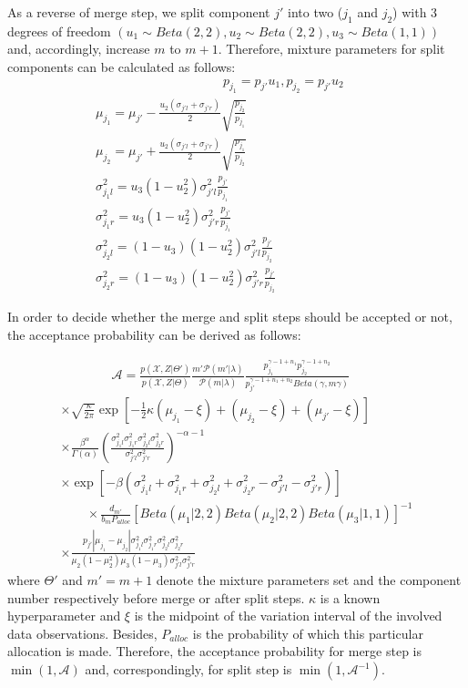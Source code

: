 As a reverse of merge step, we split component $j'$ into two ($j_1$ and $j_2$) with 3 degrees of freedom $(u_1 \sim Beta(2,2), u_2 \sim Beta(2,2), u_3 \sim Beta(1,1))$ and, accordingly, increase $m$ to $m+1$. Therefore, mixture parameters for split components can be calculated as follows:
\begin{multline}
\qquad\qquad\qquad\qquad\qquad p_{j_1} = p_{j'}u_1, p_{j_2} = p_{j'}u_2 \\
\mu_{j_1} = \mu_{j'} - \frac{u_2(\sigma_{j'l}+\sigma_{j'r})}{2} \sqrt{\frac{p_{j_2}}{p_{j_1}}} \\
\mu_{j_2} = \mu_{j'} + \frac{u_2(\sigma_{j'l}+\sigma_{j'r})}{2} \sqrt{\frac{p_{j_1}}{p_{j_2}}} \\
\sigma_{j_1l}^2 = u_3(1-u_2^2)\sigma_{j'l}^2\frac{p_{j'}}{p_{j_1}} \\
\sigma_{j_1r}^2 = u_3(1-u_2^2)\sigma_{j'r}^2\frac{p_{j'}}{p_{j_1}} \\
\sigma_{j_2l}^2 = (1-u_3)(1-u_2^2)\sigma_{j'l}^2\frac{p_{j'}}{p_{j_2}} \\
\sigma_{j_2r}^2 = (1-u_3)(1-u_2^2)\sigma_{j'r}^2\frac{p_{j'}}{p_{j_2}} \qquad\qquad\qquad\qquad
\label{eq:split}
\end{multline}

In order to decide whether the merge and split steps should be accepted or not, the acceptance probability \cite{Richardson1997} can be derived as follows: 

\begin{multline}
\qquad\qquad \mathcal{A}=\frac{p(\mathcal{X},Z|\Theta')}{p(\mathcal{X},Z|\Theta)}\frac{m'\mathcal{P}(m'|\lambda)}{\mathcal{P}(m|\lambda)}\frac{p_{j_1}^{\gamma-1+n_1}p_{j_2}^{\gamma-1+n_2}}{p_{j'}^{\gamma-1+n_1+n_2}Beta(\gamma,m\gamma)} \\
\times \sqrt{\frac{\kappa}{2\pi}} \exp[-\frac{1}{2}\kappa{(\mu_{j_1}-\xi)+(\mu_{j_2}-\xi)+(\mu_{j'}-\xi)}] \\
\times \frac{\beta^{\alpha}}{\Gamma(\alpha)}(\frac{\sigma_{j_1l}^2\sigma_{j_1r}^2\sigma_{j_2l}^2\sigma_{j_2r}^2}{\sigma_{j'l}^2\sigma_{j'r}^2})^{-\alpha-1} \qquad\qquad\qquad\qquad\\
\times \exp [{-\beta(\sigma_{j_1l}^2+\sigma_{j_1r}^2+\sigma_{j_2l}^2+\sigma_{j_2r}^2-\sigma_{j'l}^2-\sigma_{j'r}^2)}] \\
\qquad\times \frac{d_{m'}}{b_mP_{alloc}} [Beta(\mu_1|2,2)Beta(\mu_2|2,2)Beta(\mu_3|1,1)]^{-1} \\
\times \frac{p_{j'}|\mu_{j_1}-\mu_{j_2}|\sigma_{j_1l}^2\sigma_{j_1r}^2\sigma_{j_2l}^2\sigma_{j_2r}^2}{\mu_2(1-\mu_2^2)\mu_3(1-\mu_3)\sigma_{j'l}^2\sigma_{j'r}^2} \qquad\qquad\qquad\qquad\qquad\quad
\label{eq:acptProMS}
\end{multline}
where $\Theta'$ and $m' = m + 1$ denote the mixture parameters set and the component number respectively before merge or after split steps. $\kappa$ is a known hyperparameter and $\xi$ is the midpoint of the variation interval of the involved data observations. Besides, $P_{alloc}$ is the probability of which this particular allocation is made. Therefore, the acceptance probability for merge step is $\min(1,\mathcal{A})$ and, correspondingly, for split step is $\min(1,\mathcal{A}^{-1})$.

